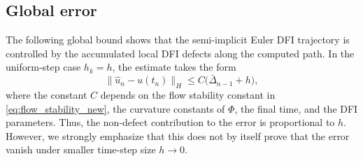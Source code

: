 \documentclass[oneside,11pt]{article}
\theoremstyle{remark}
\theoremstyle{thmstyleone}
\theoremstyle{thmstylethree}
\theoremstyle{thmstyletwo}
\newcommand{\norm}[1]{\lVert #1\rVert}
\begin{document}
\subsection{Global error}
The following global bound shows that the semi-implicit Euler DFI trajectory is controlled by the accumulated local DFI defects along the computed path. In the uniform-step case $h_k=h$, the estimate takes the form
\[
  \norm{\hat u_n-u(t_n)}_H
  \le
  C\bigl(\bar\Delta_{n-1}+h\bigr),
\]
where the constant $C$ depends on the flow stability constant in \eqref{eq:flow_stability_new}, the curvature constants of $\Phi$, the final time, and the DFI parameters. Thus, the non-defect contribution to the error is proportional to $h$. However, we strongly emphasize that this does not by itself prove that the error vanish under smaller time-step size $h \to 0$.
\end{document}
